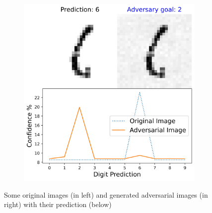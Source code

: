 \begin{figure}[H]
\begin{subfigure}{0.7\linewidth}
                \includegraphics[width=\textwidth]{images/generated_adversarial_image_4.jpg}
                \caption{}
            \end{subfigure}
            \caption{Some original images (in left) and generated adversarial images (in right) with their prediction (below)}
            \label{fig:adversarial_images}
        \end{figure}


